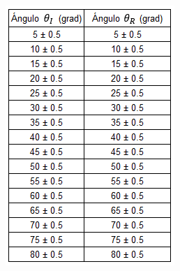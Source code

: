 \documentclass[DIV=calc, paper=a4, fontsize=11pt]{scrartcl}
\newenvironment{Figura}
  {\par\medskip\noindent\minipage{\linewidth}}
  {\endminipage\par\medskip}
\begin{document}
\begin{multicols}{2}

\begin{Figura}
    \centering
    \includegraphics[width=0.5 \textwidth]{tablas/tabla aire_lucita_reflexion.PNG}
    \label{fig}
\end{Figura}


\end{multicols}
\end{document}

